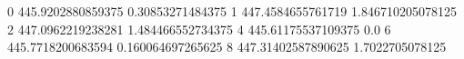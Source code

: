 0 445.9202880859375 0.30853271484375
1 447.4584655761719 1.846710205078125
2 447.0962219238281 1.484466552734375
4 445.61175537109375 0.0
6 445.7718200683594 0.160064697265625
8 447.31402587890625 1.7022705078125
